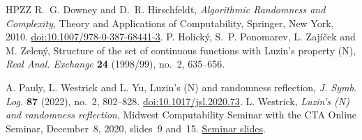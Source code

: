 \documentclass[12pt,reqno]{amsart}
\begin{document}
\begin{thebibliography}{HPZZ}
R.~G. Downey and D.~R. Hirschfeldt,
\emph{Algorithmic Randomness and Complexity}, Theory and Applications of
Computability, Springer, New York, 2010.
\href{https://doi.org/10.1007/978-0-387-68441-3}{doi:10.1007/978-0-387-68441-3}.
P. Holick\'y, S.~P. Ponomarev, L. Zaj\'i\v cek and M. Zelen\'y,
Structure of the set of continuous functions with Luzin's property (N),
\emph{Real Anal. Exchange} \textbf{24} (1998/99), no.~2, 635--656.

A. Pauly, L. Westrick and L. Yu,
Luzin's (N) and randomness reflection,
\emph{J. Symb. Log.} \textbf{87} (2022), no.~2, 802--828.
\href{https://doi.org/10.1017/jsl.2020.73}{doi:10.1017/jsl.2020.73}.
L. Westrick,
\emph{Luzin's (N) and randomness reflection},
Midwest Computability Seminar with the CTA Online Seminar,
December~8, 2020, slides~9 and~15.
\href{https://math.uchicago.edu/~drh/mcs/westrick_slides.pdf}{Seminar slides}.
\end{thebibliography}
\end{document}
